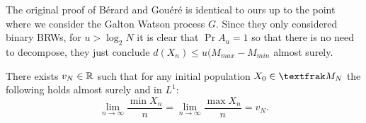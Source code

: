 The original proof of Bérard and Gouéré is identical to ours up to the point where we consider the Galton Watson process $G$. Since they only considered binary BRWs, for $u > \log_2 N$ it is clear that $\Pr{A_u} = 1$ so that there is no need to decompose, they just conclude $d(X_n) \leq u(M_{max} - M_{min}$ almost surely. 

\begin{proposition}\label{prop:ExpTailsSpeedExistence}
There exists $v_N \in \mathbb{R}$ such that for any initial population $X_0 \in \frak{M}_N$ the following holds almost surely and in $L^1$:
\begin{equation}\nonumber
\lim\limits_{n \to \infty} \frac{\min X_n}{n} = \lim\limits_{n \to \infty} \frac{\max X_n}{n} = v_N. 
\end{equation}
\end{proposition}


